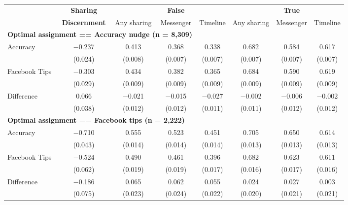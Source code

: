 
\begin{tabular}[t]{lccccccc}
 & \textbf{Sharing} &  & \textbf{False} &  &  & \textbf{True} & \\
 & \textbf{Discernment} & Any sharing & Messenger & Timeline & Any sharing & Messenger & Timeline\\\cmidrule(lr){2-2} \cmidrule(lr){3-5} \cmidrule(lr){6-8} \multicolumn{4}{l}{\textbf{Optimal assignment == Accuracy nudge (n = 8,309)}} \rule{0pt}{1.2\normalbaselineskip}\\
\hspace{1em}Accuracy & \num{-0.237} & \num{0.413} & \num{0.368} & \num{0.338} & \num{0.682} & \num{0.584} & \num{0.617}\\
 & (\num{0.024}) & (\num{0.008}) & (\num{0.007}) & (\num{0.007}) & (\num{0.007}) & (\num{0.007}) & (\num{0.007})\\
\hspace{1em}Facebook Tips & \num{-0.303} & \num{0.434} & \num{0.382} & \num{0.365} & \num{0.684} & \num{0.590} & \num{0.619}\\
 & (\num{0.029}) & (\num{0.009}) & (\num{0.009}) & (\num{0.009}) & (\num{0.009}) & (\num{0.009}) & (\num{0.009})\\\cmidrule(lr){2-8}
\hspace{1em}Difference & \num{0.066} & \num{-0.021} & \num{-0.015} & \num{-0.027} & \num{-0.002} & \num{-0.006} & \num{-0.002}\\
 & (\num{0.038}) & (\num{0.012}) & (\num{0.012}) & (\num{0.011}) & (\num{0.011}) & (\num{0.012}) & (\num{0.012})\\\multicolumn{4}{l}{\textbf{Optimal assignment == Facebook tips (n = 2,222)}} \rule{0pt}{1.2\normalbaselineskip}\\
\hspace{1em} Accuracy & \num{-0.710} & \num{0.555} & \num{0.523} & \num{0.451} & \num{0.705} & \num{0.650} & \num{0.614}\\
 & (\num{0.043}) & (\num{0.014}) & (\num{0.014}) & (\num{0.014}) & (\num{0.013}) & (\num{0.013}) & (\num{0.013})\\
\hspace{1em} Facebook Tips & \num{-0.524} & \num{0.490} & \num{0.461} & \num{0.396} & \num{0.682} & \num{0.623} & \num{0.611}\\
 & (\num{0.062}) & (\num{0.019}) & (\num{0.019}) & (\num{0.017}) & (\num{0.016}) & (\num{0.017}) & (\num{0.016})\\\cmidrule(lr){2-8}
\hspace{1em} Difference & \num{-0.186} & \num{0.065} & \num{0.062} & \num{0.055} & \num{0.024} & \num{0.027} & \num{0.003}\\
 & (\num{0.075}) & (\num{0.023}) & (\num{0.024}) & (\num{0.022}) & (\num{0.020}) & (\num{0.021}) & (\num{0.021})\\
\end{tabular}
